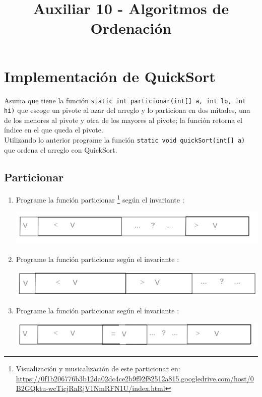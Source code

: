 \documentclass[dcc,sol]{fcfmcourse}
\title{Auxiliar 10 - Algoritmos de Ordenación}
\begin{document}
\maketitle

\vspace{-1ex}


\section*{Implementación de QuickSort}
\begin{problems}
\problem Asuma que tiene la función  \texttt{static int particionar(int[] a, int lo, int hi)} que escoge un pivote al azar del arreglo y lo particiona en dos mitades, una de los menores al pivote y otra de los mayores al pivote; la función retorna el índice en el que queda el pivote.\\
Utilizando lo anterior programe la función \texttt{static void quickSort(int[] a)} que ordena el arreglo con QuickSort.
\problem \subsection*{Particionar}
\begin{enumerate}

\item Programe la función particionar \footnote{Visualización y musicalización de este particionar en: \\ \href{https://0f1b206776b3b12da02dc4ce2b9f92f82512a815.googledrive.com/host/0B2GQktu-wcTicjRaRjV1NmRFN1U/index.html}{https://0f1b206776b3b12da02dc4ce2b9f92f82512a815.googledrive.com/host/0B2GQktu-wcTicjRaRjV1NmRFN1U/index.html}} según el invariante :
\begin{center}
\includegraphics[scale=0.5]{imagenes/particionar1.png}
\end{center}

\item Programe la función particionar según el invariante :
\begin{center}
\includegraphics[scale=0.5]{imagenes/particionar2.png}
\end{center}


\item Programe la función particionar según el invariante :
\begin{center}
\includegraphics[scale=0.5]{imagenes/particionar3.png}
\end{center}
\end{enumerate}
\end{problems}
\newpage
\end{document}
